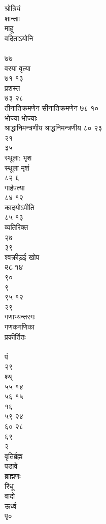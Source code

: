 \documentclass[11pt, openany]{book}
\begin{document}
{{{{{{{{{{{{{{{{{{{{{{{{{{{{{{{{{{{{{{{{{{{{{{{{{{{{{{{{{{{{{{{{{{{{{{{{{{{{{{{{{{{{{{{{{{{{{{{{{{{{{{{{{{{{{{{{{{{{{{{{{{{{{{{{{{{{{{{{{{{{{{{{{{{{{{{{{{{{{{{{{{{{{{{{श्रोत्रियं\\
शान्ताः\\
माहू\\
वदिताऽयोनि\\
~\\
७७\\
वरया वृत्या\\
७१ १३\\
प्रशस्त\\
७३ २८\\
तीनातिक्रमणेन सीनातिक्रमणेन ७८ १०\\
भोज्या भोज्याः\\
श्राद्धानिमन्त्रणीय श्राद्धनिमन्त्रणीय ८० २३\\
२१\\
३५\\
स्थूला: भृश\\
स्थूला मृशं\\
८२ ६\\
गार्हपत्या\\
८४ १२\\
कादयोऽपीति\\
८५ १३\\
व्यतिरिक्त\\
२७\\
३९\\
श्वक्रीड़ई खोप\\
૨૮ ૧૪\\
९०\\
९\\
९५ १२\\
२९\\
गणाभ्यन्तरगः\\
गणकगणिका\\
प्रकीर्तितः\\
~\\
पं\\
२९\\
श्थ्\\
५५ १४\\
५६ १५\\
१६\\
५९ २४\\
६० २८\\
६९\\
२\\
वृतिर्ब्रह्म\\
पडावे\\
ब्राह्मणः\\
रिधू\\
वादो\\
ऊर्ध्व\\
पृ०\\
}}}}}}}}}}}}}}}}}}}}}}}}}}}}}}}}}}}}}}}}}}}}}}}}}}}}}}}}}}}}}}}}}}}}}}}}}}}}}}}}}}}}}}}}}}}}}}}}}}}}}}}}}}}}}}}}}}}}}}}}}}}}}}}}}}}}}}}}}}}}}}}}}}}}}}}}}}}}}}}}}}}}}}}}
\end{document}
